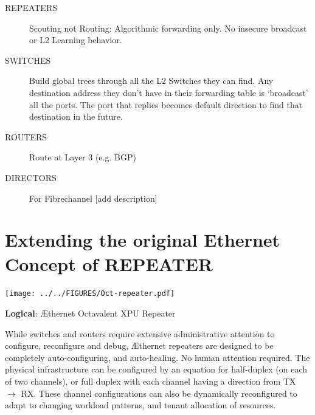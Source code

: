 \documentclass[../HFT-main.tex]{subfiles} %
\begin{document}
\begin{description}
\item [REPEATERS] Scouting not Routing: Algorithmic forwarding only.  No insecure broadcast or L2 Learning behavior. 
\item [SWITCHES] Build global trees through all the L2 Switches they can find.  Any destination address they don't have in their forwarding table is `broadcast' all the ports.  The port that replies becomes default direction to find that destination in the future.
\item [ROUTERS] Route at Layer 3 (e.g. BGP)
\item [DIRECTORS] For Fibrechannel [add description]
\end{description}

\section{Extending the original Ethernet Concept of REPEATER}
\begin{marginfigure}
  \texttt{[image: ../../FIGURES/Oct-repeater.pdf]}
  \caption{\textbf{Logical}: Æthernet  Octavalent XPU Repeater}
\end{marginfigure}


While switches and routers require extensive administrative attention to configure, reconfigure and debug, Æthernet repeaters are designed to be completely auto-configuring, and auto-healing.  No human attention required.  The physical infrastructure can be configured by an equation  for half-duplex (on each of two channels), or full duplex with each channel having a direction from TX $\rightarrow$ RX.  These channel configurations can also be dynamically reconfigured to adapt to changing workload patterns, and tenant allocation of resources.




\clearpage
\end{document}
